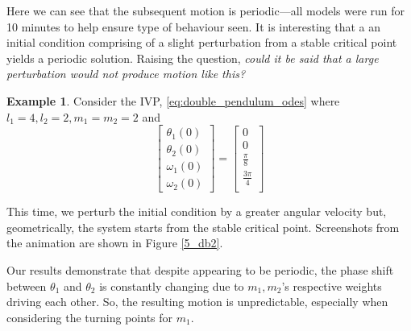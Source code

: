 \documentclass[12pt, twoside]{report}
\theoremstyle{plain}
\theoremstyle{definition}
\theoremstyle{definition}
\newtheorem{example}{Example}[chapter]
\begin{document}
            Here we can see that the subsequent motion is periodic---all models
            were run for 10 minutes to help ensure type of behaviour seen. It is 
            interesting that a an initial condition comprising of a slight 
            perturbation from a stable critical point 
            yields a periodic solution. Raising the question, \textit{could it 
            be said that a large perturbation would not produce motion like 
            this?}

            \begin{example}
            \label{5_double_2}
                Consider the IVP, \eqref{eq:double_pendulum_odes} where 
                $l_1=4, l_2=2, m_1=m_2=2$ and
                \begin{equation}
                    \begin{bmatrix}
                        \theta_1(0)\\
                        \theta_2(0)\\
                        \omega_1(0)\\
                        \omega_2(0)
                    \end{bmatrix}
                    = 
                    \begin{bmatrix}
                        0\\ 0\\ \frac{\pi}{8}\\ \frac{3\pi}{4}\\
                    \end{bmatrix}
                \label{eq:double_ics_2}
                \end{equation}

                This time, we perturb the initial condition by a greater angular
                velocity but, geometrically, the system starts from the stable 
                critical point. Screenshots from the animation are shown in 
                Figure \ref{5_db2}.
            \end{example}

            Our results demonstrate that despite appearing to be periodic, the 
            phase shift between $\theta_1$ and $\theta_2$ is constantly changing
            due to $m_1, m_2$'s respective weights driving each other. So, the
            resulting motion is unpredictable, especially when considering the 
            turning points for $m_1$.
\end{document}
